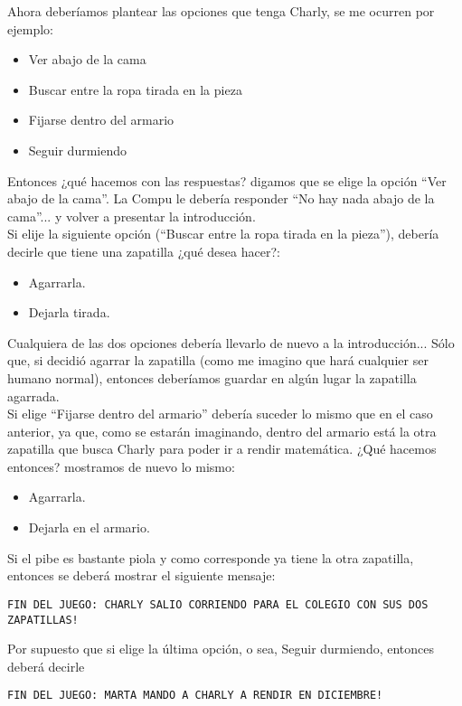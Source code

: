 Ahora deberíamos plantear las opciones que tenga Charly, se me ocurren por ejemplo:
\begin{itemize}
  \item Ver abajo de la cama
  \item Buscar entre la ropa tirada en la pieza
  \item Fijarse dentro del armario
  \item Seguir durmiendo
\end{itemize}

Entonces ¿qué hacemos con las respuestas? digamos que se elige la opción “Ver abajo de la cama”. La Compu le debería responder “No hay nada abajo de la cama”... y volver a presentar la introducción.\\

Si elije la siguiente opción (“Buscar entre la ropa tirada en la pieza”), debería decirle que tiene una zapatilla ¿qué desea hacer?:
\begin{itemize}
  \item Agarrarla.
  \item Dejarla tirada.
\end{itemize}

Cualquiera de las dos opciones debería llevarlo de nuevo a la introducción... Sólo que, si decidió agarrar la zapatilla (como me imagino que hará cualquier ser humano normal), entonces deberíamos guardar en algún lugar la zapatilla agarrada.\\

Si elige “Fijarse dentro del armario” debería suceder lo mismo que en el caso anterior, ya que, como se estarán imaginando, dentro del armario está la otra zapatilla que busca Charly para poder ir a rendir matemática. ¿Qué hacemos entonces? mostramos de nuevo lo mismo:
\begin{itemize}
  \item Agarrarla.
  \item Dejarla en el armario.
\end{itemize}

Si el pibe es bastante piola y como corresponde ya tiene la otra zapatilla, entonces se deberá mostrar el siguiente mensaje:
\begin{lstlisting}
FIN DEL JUEGO: CHARLY SALIO CORRIENDO PARA EL COLEGIO CON SUS DOS ZAPATILLAS!
\end{lstlisting}

Por supuesto que si elige la última opción, o sea,  Seguir durmiendo, entonces deberá decirle
\begin{lstlisting}
FIN DEL JUEGO: MARTA MANDO A CHARLY A RENDIR EN DICIEMBRE!
\end{lstlisting}